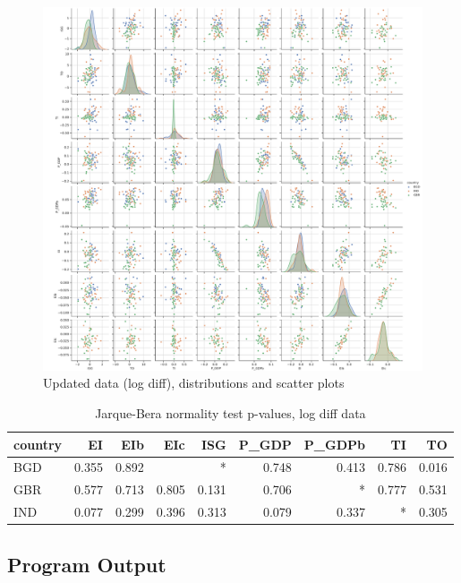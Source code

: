 \documentclass[11pt,a4paper]{article}
\begin{document}
\begin{figure}[htbp]
\centering
\includegraphics[width=\textwidth]{./plots/logdiff_pairplot.pdf}
\caption{Updated data (log diff), distributions and scatter plots}
\label{fig:logdiff_scatterplot}
\end{figure}

\begin{table}[htbp]
\centering
\begin{tabular}{lrrrrrrrr}
\toprule
country &    EI &   EIb &   EIc &   ISG &  P\_GDP &  P\_GDPb &    TI &    TO \\
\midrule
    BGD & 0.355 & 0.892 &       &     * &  0.748 &   0.413 & 0.786 & 0.016 \\
    GBR & 0.577 & 0.713 & 0.805 & 0.131 &  0.706 &       * & 0.777 & 0.531 \\
    IND & 0.077 & 0.299 & 0.396 & 0.313 &  0.079 &   0.337 &     * & 0.305 \\
\bottomrule
\end{tabular}
\caption{Jarque-Bera normality test p-values, log diff data}
\label{tab:normality_test}
\end{table}



\clearpage
\subsection{Program Output}\label{sec:program_output}
\end{document}
